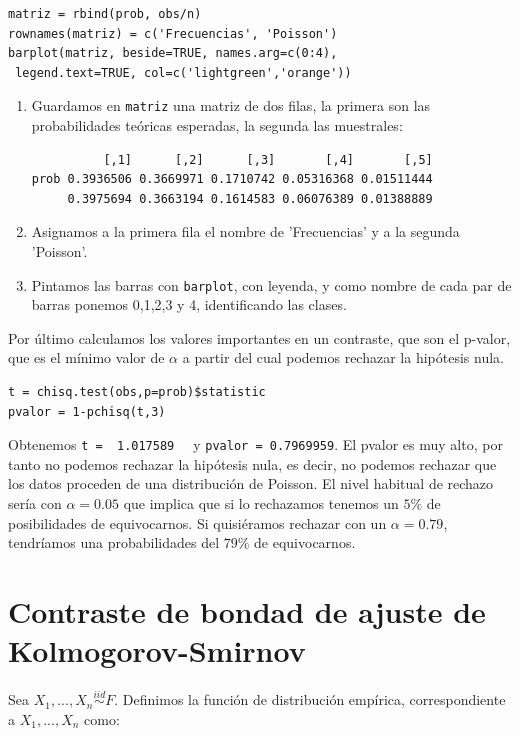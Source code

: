 \documentclass[palatino,nochap]{apuntes}
\begin{document}
\begin{example}
\begin{verbatim}
matriz = rbind(prob, obs/n)
rownames(matriz) = c('Frecuencias', 'Poisson')
barplot(matriz, beside=TRUE, names.arg=c(0:4),
 legend.text=TRUE, col=c('lightgreen','orange'))
\end{verbatim}

\begin{enumerate}
\item Guardamos en \verb|matriz| una matriz de dos filas, la primera son las probabilidades teóricas esperadas, la segunda las muestrales:
\begin{verbatim}
          [,1]      [,2]      [,3]       [,4]       [,5]
prob 0.3936506 0.3669971 0.1710742 0.05316368 0.01511444
     0.3975694 0.3663194 0.1614583 0.06076389 0.01388889
\end{verbatim}
\item Asignamos a la primera fila el nombre de 'Frecuencias' y a la segunda 'Poisson'.
\item Pintamos las barras con \verb|barplot|, con leyenda, y como nombre de cada par de barras ponemos 0,1,2,3 y 4, identificando las clases.
\end{enumerate}

Por último calculamos los valores importantes en un contraste, que son el p-valor, que es el mínimo valor de $\alpha$ a partir del cual podemos rechazar la hipótesis nula.

\begin{verbatim}
t = chisq.test(obs,p=prob)$statistic
pvalor = 1-pchisq(t,3)
\end{verbatim}

Obtenemos \verb|t =  1.017589  | y \verb|pvalor = 0.7969959|. El pvalor es muy alto, por tanto no podemos rechazar la hipótesis nula, es decir, no podemos rechazar que los datos proceden de una distribución de Poisson.  El nivel habitual de rechazo sería con $\alpha = 0.05$ que implica que si lo rechazamos tenemos un $5\%$ de posibilidades de equivocarnos. Si quisiéramos rechazar con un $\alpha = 0.79$, tendríamos una probabilidades del $79\%$ de equivocarnos.



\end{example}



\section{Contraste de bondad de ajuste de Kolmogorov-Smirnov}
Sea $X_1,...,X_n \stackrel{iid}{\sim} F$. Definimos la función de distribución empírica, correspondiente a $X_1,...,X_n$ como:
\end{document}
